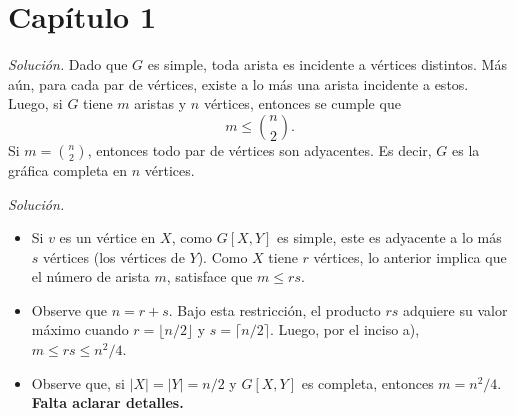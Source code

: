 \documentclass[12pt]{article}
\newenvironment{problem}[2][Problema]{\begin{trivlist}
\item[\hskip \labelsep {\bfseries #1}\hskip \labelsep {\bfseries #2}]}{\end{trivlist}}
\begin{document}
\section*{Capítulo 1}

\begin{problem}{1.1.1}
\end{problem}
\textit{Solución.} Dado que $G$ es simple, toda arista es incidente a vértices distintos. Más aún, para cada par de vértices, existe a lo más una arista incidente a estos. Luego, si $G$ tiene $m$ aristas y $n$ vértices, entonces se cumple que 
$$ m \leq {n \choose 2 }.$$
Si $m = {n \choose 2}$, entonces todo par de vértices son adyacentes. Es decir, $G$ es la gráfica completa en $n$ vértices.

\begin{problem}{1.1.2}
\end{problem}
\textit{Solución.} \begin{itemize}
    \item[a)] Si $v$ es un vértice en $X$, como $G[X, Y]$ es simple, este es adyacente a lo más $s$ vértices (los vértices de $Y$). Como $X$ tiene $r$ vértices, lo anterior implica que el número de arista $m$, satisface que  $m \leq rs.$
    \item[b)] Observe que $n = r + s.$ Bajo esta restricción, el producto $rs$ adquiere su valor máximo cuando $r = \lfloor n/2 \rfloor$ y $s = \lceil n/2 \rceil.$ Luego, por el inciso a), $m \leq rs \leq  n^2 /4.$
    \item[c)] Observe que, si $\lvert X \rvert = \lvert Y \rvert = n/2$ y $G[X,Y]$ es completa, entonces $m = n^2/4.$
    \textbf{Falta aclarar detalles.}
\end{itemize}
\end{document}
